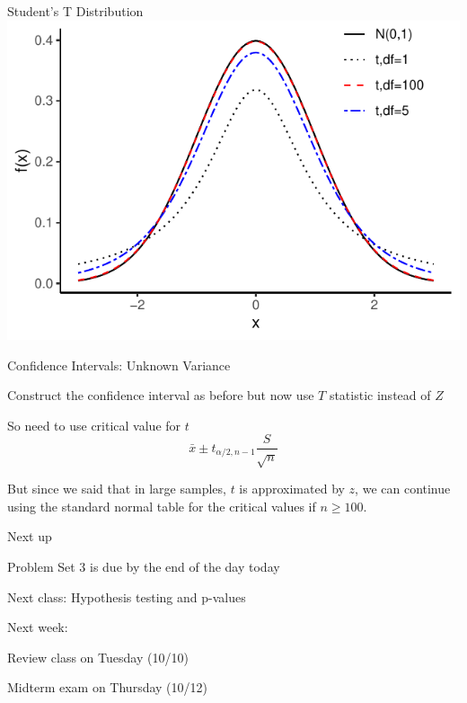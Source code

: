 \documentclass{./../div_teaching_slides}
\begin{document}
\begin{frame}{Student's T Distribution}
\centering
	\includegraphics{./../../Output/tdist.pdf} 
\end{frame}

\begin{frame}{Confidence Intervals: Unknown Variance}
\begin{witemize}
  \item Construct the confidence interval as before but now use $T$ statistic instead of $Z$
  \item So need to use critical value for $t$
  $$ \bar{x} \pm  t_{\alpha/2,n-1}  \frac{S}{\sqrt{n}}$$
 \item But since we said that in large samples, $t$ is approximated by $z$, we can continue using the standard normal table for the critical values if $n \geq 100$. 
\end{witemize}
\end{frame}


\begin{frame}{Next up}
\vspace{-0.5em}
\begin{witemize}
  \item Problem Set 3 is due by the end of the day today 
  \item Next class: Hypothesis testing and p-values
  \item Next week: \\
  \begin{witemize}
  \normalsize
  \item Review class on Tuesday (10/10)
  \item Midterm exam on Thursday (10/12)
\end{witemize}
\end{witemize}
\end{frame}
\end{document}
